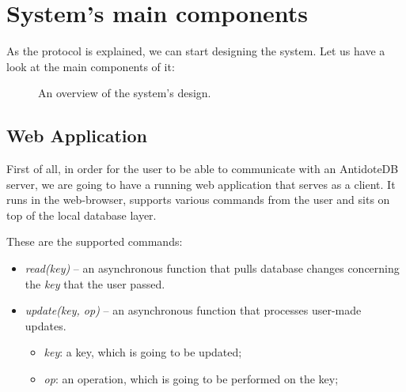 \section{System's main components}


As the protocol is explained, we can start designing the system. Let us have a look at the main components of it:

\begin{figure}[!htb]
    \begin{center}
    \setlength{\fboxsep}{4pt}%
    \setlength{\fboxrule}{1pt}%
    \caption {An overview of the system's design.}
    \label{fig:design5}
\end{center}
\end{figure}

\subsection{Web Application}

First of all, in order for the user to be able to communicate with an AntidoteDB server, we are going to have a running web application that serves as a client. It runs in the web-browser, supports various commands from the user and sits on top of the local database layer. 

\vspace{5mm}These are the supported commands:

\begin{itemize}
    \item \textit{read(key)} -- an asynchronous function that pulls database changes concerning the \textit{key} that the user passed.
    \item \textit{update(key, op)}  -- an asynchronous function that processes user-made updates.
     \begin{itemize}
         \item \textit{key}: a key, which is going to be updated;
         \item \textit{op}: an operation, which is going to be performed on the key;
     \end{itemize}
  \end{itemize}

